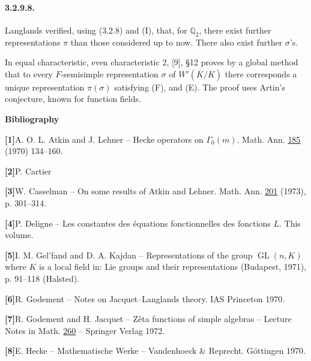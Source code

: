 \documentclass[10pt,a4paper]{article}
\providecommand{\GL}{\operatorname{GL}}
\providecommand{\Q}{\mathbb Q}
\begin{document}
\paragraph{3.2.9.8.} Langlands verified, using (3.2.8) and (I), that, for \(\Q_2\), there exist further representations \(\pi\) than those considered up to now. There also exist further \(\sigma\)'s.

In equal characteristic, even characteristic \(2\), [9], §12 proves by a global method that to every \(F\)-semisimple representation \(\sigma\) of \(W'(\overline K/K)\) there corresponds a unique representation \(\pi(\sigma)\) satisfying (F), and (E). The proof uses Artin's conjecture, known for function fields.

\clearpage
{}
\hypertarget{authority-51}{}
\begin{center}
\textbf{Bibliography}
\end{center}

\noindent\textbf{[1]}\quad A. O. L. Atkin and J. Lehner -- Hecke operators on \(\Gamma_0(m)\). Math. Ann. \underline{185} (1970) 134--160.\par\medskip

\noindent\textbf{[2]}\quad P. Cartier\par\medskip

\noindent\textbf{[3]}\quad W. Casselman -- On some results of Atkin and Lehner. Math. Ann. \underline{201} (1973), p. 301--314.\par\medskip

\noindent\textbf{[4]}\quad P. Deligne -- Les constantes des équations fonctionnelles des fonctions \(L\). This volume.\par\medskip

\noindent\textbf{[5]}\quad I. M. Gel'fand and D. A. Kajdan -- Representations of the group \(\GL(n,K)\) where \(K\) is a local field in: Lie groups and their representations (Budapest, 1971), p. 91--118 (Halsted).\par\medskip

\noindent\textbf{[6]}\quad R. Godement -- Notes on Jacquet--Langlands theory. IAS Princeton 1970.\par\medskip

\noindent\textbf{[7]}\quad R. Godement and H. Jacquet -- Zêta functions of simple algebras -- Lecture Notes in Math. \underline{260} -- Springer Verlag 1972.\par\medskip

\noindent\textbf{[8]}\quad E. Hecke -- Mathematische Werke -- Vandenhoeck \& Reprecht. Göttingen 1970.\par\medskip
\end{document}

